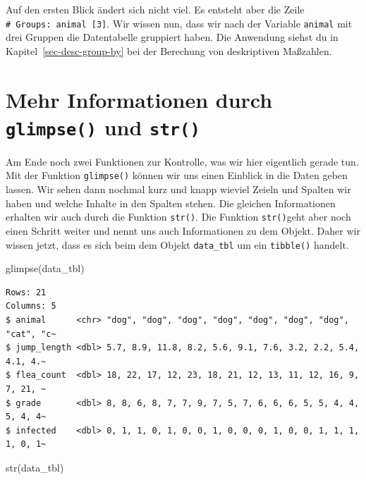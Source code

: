 \documentclass[
  letterpaper,
  DIV=11,
  oneside]{scrreport}
\newenvironment{Shaded}{\begin{snugshade}}{\end{snugshade}}
\newcommand{\FunctionTok}[1]{\textcolor[rgb]{0.28,0.35,0.67}{#1}}
\newcommand{\NormalTok}[1]{\textcolor[rgb]{0.00,0.23,0.31}{#1}}
\begin{document}
Auf den ersten Blick ändert sich nicht viel. Es entsteht aber die Zeile
\texttt{\#\ Groups:\ animal\ {[}3{]}}. Wir wissen nun, dass wir nach der
Variable \texttt{animal} mit drei Gruppen die Datentabelle gruppiert
haben. Die Anwendung siehst du in Kapitel~\ref{sec-desc-group-by} bei
der Berechung von deskriptiven Maßzahlen.

\hypertarget{mehr-informationen-durch-glimpse-und-str}{%
\section{\texorpdfstring{Mehr Informationen durch \texttt{glimpse()} und
\texttt{str()}}{Mehr Informationen durch glimpse() und str()}}\label{mehr-informationen-durch-glimpse-und-str}}

Am Ende noch zwei Funktionen zur Kontrolle, was wir hier eigentlich
gerade tun. Mit der Funktion \texttt{glimpse()} können wir uns einen
Einblick in die Daten geben lassen. Wir sehen dann nochmal kurz und
knapp wieviel Zeieln und Spalten wir haben und welche Inhalte in den
Spalten stehen. Die gleichen Informationen erhalten wir auch durch die
Funktion \texttt{str()}. Die Funktion \texttt{str()}geht aber noch einen
Schritt weiter und nennt uns auch Informationen zu dem Objekt. Daher wir
wissen jetzt, dass es sich beim dem Objekt \texttt{data\_tbl} um ein
\texttt{tibble()} handelt.

\begin{Shaded}
\begin{Highlighting}[]
\FunctionTok{glimpse}\NormalTok{(data\_tbl)}
\end{Highlighting}
\end{Shaded}

\begin{verbatim}
Rows: 21
Columns: 5
$ animal      <chr> "dog", "dog", "dog", "dog", "dog", "dog", "dog", "cat", "c~
$ jump_length <dbl> 5.7, 8.9, 11.8, 8.2, 5.6, 9.1, 7.6, 3.2, 2.2, 5.4, 4.1, 4.~
$ flea_count  <dbl> 18, 22, 17, 12, 23, 18, 21, 12, 13, 11, 12, 16, 9, 7, 21, ~
$ grade       <dbl> 8, 8, 6, 8, 7, 7, 9, 7, 5, 7, 6, 6, 6, 5, 5, 4, 4, 5, 4, 4~
$ infected    <dbl> 0, 1, 1, 0, 1, 0, 0, 1, 0, 0, 0, 1, 0, 0, 1, 1, 1, 1, 0, 1~
\end{verbatim}

\begin{Shaded}
\begin{Highlighting}[]
\FunctionTok{str}\NormalTok{(data\_tbl)}
\end{Highlighting}
\end{Shaded}
\end{document}
